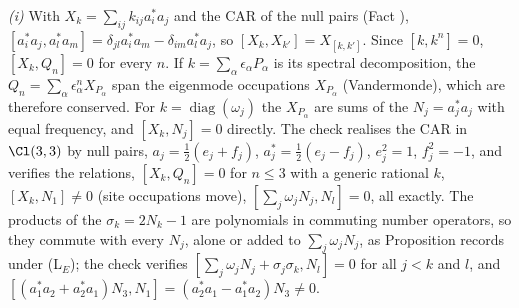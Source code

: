 \emph{(i)} With $X_{k} = \sum_{ij}k_{ij}a_{i}^{*}a_{j}$ and the CAR of the null pairs (Fact ), $[a_{i}^{*}a_{j}, a_{l}^{*}a_{m}] = \delta_{jl}a_{i}^{*}a_{m} - \delta_{im}a_{l}^{*}a_{j}$, so $[X_{k}, X_{k'}] = X_{[k, k']}$. Since $[k, k^{n}] = 0$, $[X_{k}, Q_{n}] = 0$ for every $n$. If $k = \sum_{\alpha}\epsilon_{\alpha}P_{\alpha}$ is its spectral decomposition, the $Q_{n} = \sum_{\alpha}\epsilon_{\alpha}^{n}X_{P_{\alpha}}$ span the eigenmode occupations $X_{P_{\alpha}}$ (Vandermonde), which are therefore conserved. For $k = \operatorname{diag}(\omega_{j})$ the $X_{P_{\alpha}}$ are sums of the $N_{j} = a_{j}^{*}a_{j}$ with equal frequency, and $[X_{k}, N_{j}] = 0$ directly. The check realises the CAR in $\Cl(3,3)$ by null pairs, $a_{j} = \tfrac12(e_{j} + f_{j})$, $a_{j}^{*} = \tfrac12(e_{j} - f_{j})$, $e_{j}^{2} = 1$, $f_{j}^{2} = -1$, and verifies the relations, $[X_{k}, Q_{n}] = 0$ for $n \le 3$ with a generic rational $k$, $[X_{k}, N_{1}] \neq 0$ (site occupations move), $[\sum_{j}\omega_{j}N_{j}, N_{l}] = 0$, all exactly. The products of the $\sigma_{k} = 2N_{k} - 1$ are polynomials in commuting number operators, so they commute with every $N_{j}$, alone or added to $\sum_{j}\omega_{j}N_{j}$, as Proposition  records under (L$_E$); the check verifies $[\sum_{j}\omega_{j}N_{j} + \sigma_{j}\sigma_{k}, N_{l}] = 0$ for all $j < k$ and $l$, and $[(a_{1}^{*}a_{2} + a_{2}^{*}a_{1})N_{3}, N_{1}] = (a_{2}^{*}a_{1} - a_{1}^{*}a_{2})N_{3} \neq 0$.

